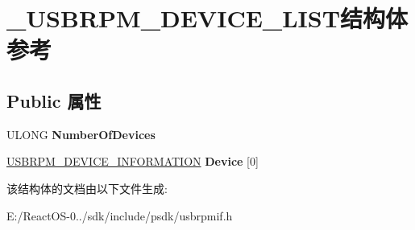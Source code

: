 \hypertarget{struct___u_s_b_r_p_m___d_e_v_i_c_e___l_i_s_t}{}\section{\+\_\+\+U\+S\+B\+R\+P\+M\+\_\+\+D\+E\+V\+I\+C\+E\+\_\+\+L\+I\+S\+T结构体 参考}
\label{struct___u_s_b_r_p_m___d_e_v_i_c_e___l_i_s_t}
\subsection*{Public 属性}
\begin{DoxyCompactItemize}
\item 
\mbox{\label{struct___u_s_b_r_p_m___d_e_v_i_c_e___l_i_s_t_aed95942363b13412e54e3b1462a3ce0c}} 
U\+L\+O\+NG {\bfseries Number\+Of\+Devices}
\item 
\mbox{\label{struct___u_s_b_r_p_m___d_e_v_i_c_e___l_i_s_t_afaf6f60545e545d9487f2bf35605805d}} 
\hyperlink{struct___u_s_b_r_p_m___d_e_v_i_c_e___i_n_f_o_r_m_a_t_i_o_n}{U\+S\+B\+R\+P\+M\+\_\+\+D\+E\+V\+I\+C\+E\+\_\+\+I\+N\+F\+O\+R\+M\+A\+T\+I\+ON} {\bfseries Device} \mbox{[}0\mbox{]}
\end{DoxyCompactItemize}


该结构体的文档由以下文件生成\+:\begin{DoxyCompactItemize}
\item 
E\+:/\+React\+O\+S-\/0../sdk/include/psdk/usbrpmif.\+h\end{DoxyCompactItemize}
